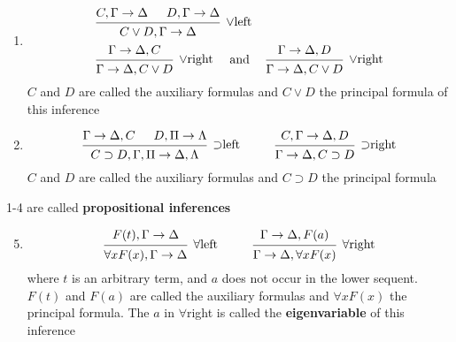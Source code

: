 \documentclass[11pt]{article}
\begin{document}
\begin{definition}[]
\begin{enumerate}
\item \begin{align*}
&
\begin{prooftree}[center=false]
\hypo{C,\Gamma\to\Delta}
\hypo{D,\Gamma\to\Delta}
\infer2[\(\vee\)left]{C\vee D,\Gamma\to\Delta}
\end{prooftree}\\&
\begin{prooftree}%
\hypo{\Gamma\to\Delta,C}
\infer1[\(\vee\)right]{\Gamma\to\Delta,C\vee D}
\end{prooftree}\quad\text{ and }\quad
\begin{prooftree}%
\hypo{\Gamma\to\Delta,D}
\infer1[\(\vee\)right]{\Gamma\to\Delta,C\vee D}
\end{prooftree}
\end{align*}
\(C\) and \(D\) are called the auxiliary formulas and \(C\vee D\) the
principal formula of this inference
\item \begin{equation*}
\begin{prooftree}%
\hypo{\Gamma\to\Delta,C}
\hypo{D,\Pi\to \Lambda}
\infer2[\(\supset\)left]{C\supset D,\Gamma,\Pi\to\Delta,\Lambda}
\end{prooftree}\hspace{1cm}
\begin{prooftree}%
\hypo{C,\Gamma\to\Delta,D}
\infer1[\(\supset\)right]{\Gamma\to\Delta,C\supset D}
\end{prooftree}
\end{equation*}
\(C\) and \(D\) are called the auxiliary formulas and \(C\supset D\) the
principal formula
\end{enumerate}


1-4 are called \textbf{propositional inferences}
\begin{enumerate}
\setcounter{enumi}{4}
\item \begin{equation*}
\begin{prooftree}%
\hypo{F(t),\Gamma\to\Delta}
\infer1[\(\forall\)left]{\forall xF(x),\Gamma\to\Delta}
\end{prooftree}\hspace{1cm}
\begin{prooftree}%
\hypo{\Gamma\to\Delta,F(a)}
\infer1[\(\forall\)right]{\Gamma\to\Delta,\forall xF(x)}
\end{prooftree}
\end{equation*}
where \(t\) is an arbitrary term, and \(a\) does not occur in the lower
sequent. \(F(t)\) and \(F(a)\) are called the auxiliary formulas and
\(\forall xF(x)\) the principal formula. The \(a\) in \(\forall\)right is called
the \textbf{eigenvariable} of this inference
\end{enumerate}



\end{definition}
\end{document}
